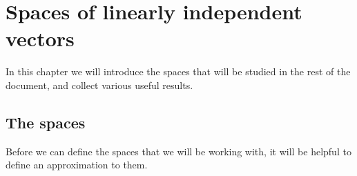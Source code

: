 



\chapter{Spaces of linearly independent vectors}


In this chapter we will introduce the spaces that will be studied in
the rest of the document, and collect various useful
results.

\section{The spaces} 
\label{sec:rum}
Before we can define the spaces that we will be working with, it will
be helpful to define an approximation to them.

